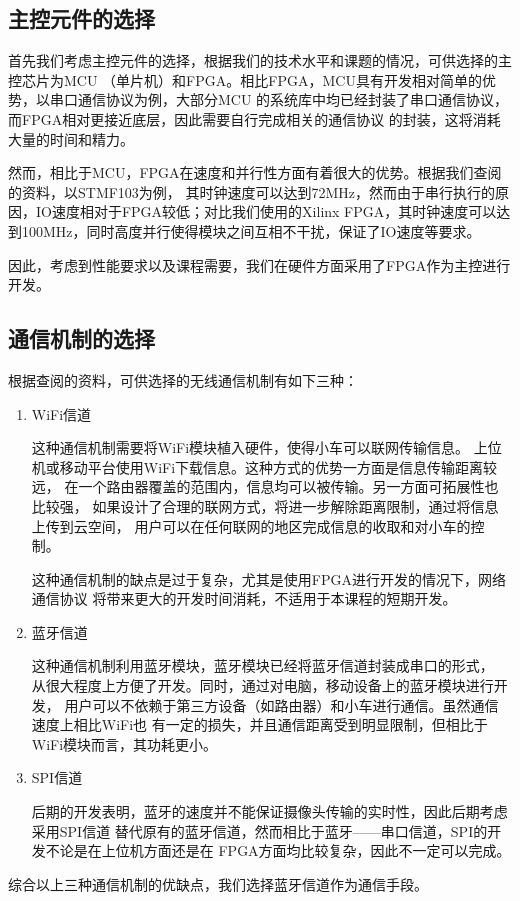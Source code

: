 \documentclass[a4paper]{paper}
\begin{document}
\subsection{主控元件的选择}
首先我们考虑主控元件的选择，根据我们的技术水平和课题的情况，可供选择的主控芯片为MCU
（单片机）和FPGA。相比FPGA，MCU具有开发相对简单的优势，以串口通信协议为例，大部分MCU
的系统库中均已经封装了串口通信协议，而FPGA相对更接近底层，因此需要自行完成相关的通信协议
的封装，这将消耗大量的时间和精力。

然而，相比于MCU，FPGA在速度和并行性方面有着很大的优势。根据我们查阅的资料，以STMF103为例，
其时钟速度可以达到72MHz，然而由于串行执行的原因，IO速度相对于FPGA较低；对比我们使用的Xilinx
FPGA，其时钟速度可以达到100MHz，同时高度并行使得模块之间互相不干扰，保证了IO速度等要求。

因此，考虑到性能要求以及课程需要，我们在硬件方面采用了FPGA作为主控进行开发。
\subsection{通信机制的选择}
根据查阅的资料，可供选择的无线通信机制有如下三种：

\begin{enumerate}
    \item WiFi信道

    这种通信机制需要将WiFi模块植入硬件，使得小车可以联网传输信息。
    上位机或移动平台使用WiFi下载信息。这种方式的优势一方面是信息传输距离较远，
    在一个路由器覆盖的范围内，信息均可以被传输。另一方面可拓展性也比较强，
    如果设计了合理的联网方式，将进一步解除距离限制，通过将信息上传到云空间，
    用户可以在任何联网的地区完成信息的收取和对小车的控制。

    这种通信机制的缺点是过于复杂，尤其是使用FPGA进行开发的情况下，网络通信协议
    将带来更大的开发时间消耗，不适用于本课程的短期开发。

    \item 蓝牙信道

    这种通信机制利用蓝牙模块，蓝牙模块已经将蓝牙信道封装成串口的形式，
    从很大程度上方便了开发。同时，通过对电脑，移动设备上的蓝牙模块进行开发，
    用户可以不依赖于第三方设备（如路由器）和小车进行通信。虽然通信速度上相比WiFi也
    有一定的损失，并且通信距离受到明显限制，但相比于WiFi模块而言，其功耗更小。

    \item SPI信道

    后期的开发表明，蓝牙的速度并不能保证摄像头传输的实时性，因此后期考虑采用SPI信道
    替代原有的蓝牙信道，然而相比于蓝牙——串口信道，SPI的开发不论是在上位机方面还是在
    FPGA方面均比较复杂，因此不一定可以完成。

\end{enumerate}
综合以上三种通信机制的优缺点，我们选择蓝牙信道作为通信手段。
\end{document}
